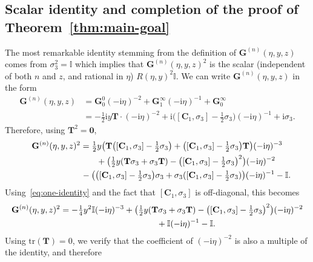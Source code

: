 \documentclass[pdftex]{sigma}
\numberwithin{equation}{section}
\begin{document}
\subsection{Scalar identity and completion of the proof of Theorem~\ref{thm:main-goal}}
The most remarkable identity stemming from the definition of $\mathbf{G}^{(n)}(\eta,y,z)$ comes from $\sigma_3^2=\mathbb{I}$ which implies that $\mathbf{G}^{(n)}(\eta,y,z)^2$ is the scalar (independent of both $n$ and $z$, and rational in $\eta$) $R(\eta,y)^2\mathbb{I}$. We can write $\mathbf{G}^{(n)}(\eta,y,z)$ in the form
\begin{align*}
\mathbf{G}^{(n)}(\eta,y,z)& =\mathbf{G}_0^0(-\mathrm{i}\eta)^{-2} + \mathbf{G}_1^\infty(-\mathrm{i}\eta)^{-1} +\mathbf{G}_0^\infty \\
& = -\tfrac{1}{2}\mathrm{i} y\mathbf{T}\cdot(-\mathrm{i}\eta)^{-2} +
\mathrm{i} \bigl([\mathbf{C}_1,\sigma_3]-\tfrac{1}{2}\sigma_3\bigr)(-\mathrm{i}\eta)^{-1} +\mathrm{i}\sigma_3.
\end{align*}
Therefore, using $\mathbf{T}^2=\mathbf{0}$,
\begin{gather*}
\mathbf{G}^{(n)}(\eta,y,z)^2 = \tfrac{1}{2}y\bigl(\mathbf{T}\bigl([\mathbf{C}_1,\sigma_3]-\tfrac{1}{2}\sigma_3\bigr)+\bigl([\mathbf{C}_1,\sigma_3]-\tfrac{1}{2}\sigma_3\bigr)\mathbf{T}\bigr)(-\mathrm{i}\eta)^{-3} \\
\hphantom{\mathbf{G}^{(n)}(\eta,y,z)^2 = }{}+ \bigl(\tfrac{1}{2}y(\mathbf{T}\sigma_3 + \sigma_3\mathbf{T})-\bigl([\mathbf{C}_1,\sigma_3]-\tfrac{1}{2}\sigma_3\bigr)^2\bigr)(-\mathrm{i}\eta)^{-2} \\
\hphantom{\mathbf{G}^{(n)}(\eta,y,z)^2 = }{}-\bigl(\bigl([\mathbf{C}_1,\sigma_3]-\tfrac{1}{2}\sigma_3\bigr)\sigma_3 + \sigma_3([\mathbf{C}_1,\sigma_3]-\tfrac{1}{2}\sigma_3)\bigr)(-\mathrm{i}\eta)^{-1} -\mathbb{I}.
\end{gather*}
Using~\eqref{eq:one-identity} and the fact that $[\mathbf{C}_1,\sigma_3]$ is off-diagonal, this becomes
\begin{gather*}
\mathbf{G}^{(n)}(\eta,y,z)^2 = -\tfrac{1}{4}y^2\mathbb{I}(-\mathrm{i}\eta)^{-3} + \bigl(\tfrac{1}{2}y(\mathbf{T}\sigma_3 + \sigma_3\mathbf{T})-\bigl([\mathbf{C}_1,\sigma_3]-\tfrac{1}{2}\sigma_3\bigr)^2\bigr)(-\mathrm{i}\eta)^{-2} \\
\hphantom{\mathbf{G}^{(n)}(\eta,y,z)^2 =}{}+\mathbb{I}(-\mathrm{i}\eta)^{-1}-\mathbb{I}.
\end{gather*}
Using $\mathrm{tr}(\mathbf{T})=0$, we verify that the coefficient of $(-\mathrm{i}\eta)^{-2}$ is also a multiple of the identity, and therefore
\end{document}
